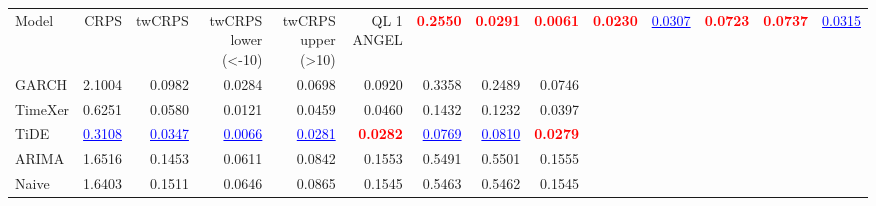 \begin{tabular}{lrrrrrrrr}
\toprule
Model & CRPS & twCRPS & twCRPS lower (<-10) & twCRPS upper (>10) & QL 1%
\midrule
ANGEL & \textcolor{red}{\textbf{0.2550}} & \textcolor{red}{\textbf{0.0291}} & \textcolor{red}{\textbf{0.0061}} & \textcolor{red}{\textbf{0.0230}} & \textcolor{blue}{\underline{0.0307}} & \textcolor{red}{\textbf{0.0723}} & \textcolor{red}{\textbf{0.0737}} & \textcolor{blue}{\underline{0.0315}} \\
GARCH & 2.1004 & 0.0982 & 0.0284 & 0.0698 & 0.0920 & 0.3358 & 0.2489 & 0.0746 \\
TimeXer & 0.6251 & 0.0580 & 0.0121 & 0.0459 & 0.0460 & 0.1432 & 0.1232 & 0.0397 \\
TiDE & \textcolor{blue}{\underline{0.3108}} & \textcolor{blue}{\underline{0.0347}} & \textcolor{blue}{\underline{0.0066}} & \textcolor{blue}{\underline{0.0281}} & \textcolor{red}{\textbf{0.0282}} & \textcolor{blue}{\underline{0.0769}} & \textcolor{blue}{\underline{0.0810}} & \textcolor{red}{\textbf{0.0279}} \\
ARIMA & 1.6516 & 0.1453 & 0.0611 & 0.0842 & 0.1553 & 0.5491 & 0.5501 & 0.1555 \\
Naive & 1.6403 & 0.1511 & 0.0646 & 0.0865 & 0.1545 & 0.5463 & 0.5462 & 0.1545 \\
\bottomrule
\end{tabular}
